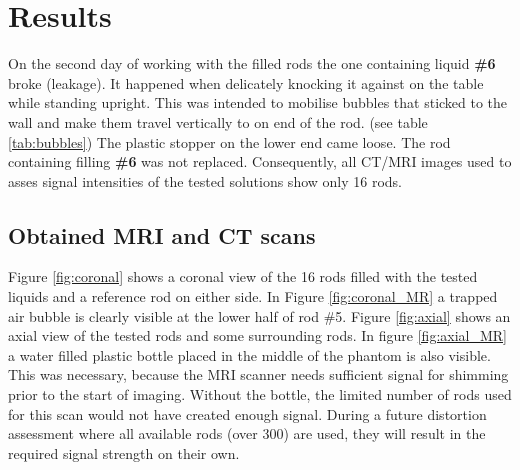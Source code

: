 

\chapter{Results}

On the second day of working with the filled rods the one containing liquid \textbf{\#6} broke (leakage).
It happened when delicately knocking it against on the table while standing upright.
This was intended to mobilise bubbles that sticked to the wall and make them travel vertically to on end of the rod. (see table \ref{tab:bubbles})
The plastic stopper on the lower end came loose.
The rod containing filling \textbf{\#6} was not replaced.
Consequently, all CT/MRI images used to asses signal intensities of the tested solutions show only 16 rods.

\section{Obtained MRI and CT scans}
Figure \ref{fig:coronal} shows a coronal view of the 16 rods filled with the tested liquids and a reference rod on either side.
In Figure \ref{fig:coronal_MR} a trapped air bubble is clearly visible at the lower half of rod \#5.
Figure \ref{fig:axial} shows an axial view of the tested rods and some surrounding rods.
In figure \ref{fig:axial_MR} a water filled plastic bottle placed in the middle of the phantom is also visible.
This was necessary, because the MRI scanner needs sufficient signal for shimming prior to the start of imaging.
Without the bottle, the limited number of rods used for this scan would not have created enough signal.
During a future distortion assessment where all available rods (over 300) are used, they will result in the required signal strength on their own.
 
